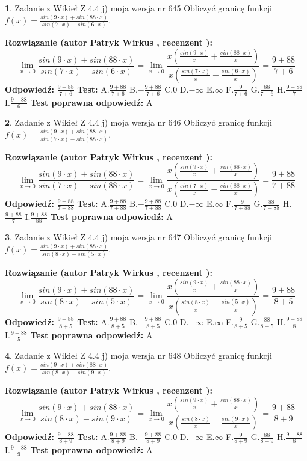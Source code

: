 \documentclass[12pt, a4paper]{article}
\theoremstyle{definition} %
\newtheorem{zad}{}
\newcommand{\zadStart}[1]{\begin{zad}#1\newline}
\newcommand{\zadStop}{\end{zad}}
\newcommand{\rozwStart}[2]{\noindent \textbf{Rozwiązanie (autor #1 , recenzent #2): }\newline}
\newcommand{\rozwStop}{\newline}
\newcommand{\odpStart}{\noindent \textbf{Odpowiedź:}\newline}
\newcommand{\odpStop}{\newline}
\newcommand{\testStart}{\noindent \textbf{Test:}\newline}
\newcommand{\testStop}{\newline}
\newcommand{\kluczStart}{\noindent \textbf{Test poprawna odpowiedź:}\newline}
\newcommand{\kluczStop}{\newline}
\begin{document}
\zadStart{Zadanie z Wikieł Z 4.4 j) moja wersja nr 645}
Obliczyć granicę funkcji $f(x)=\frac{sin(9\cdot x) +sin(88\cdot x)}{sin(7\cdot x) -sin(6\cdot x)}$.
\zadStop
\rozwStart{Patryk Wirkus}{}
$$\lim\limits_{x\to 0}\frac{sin(9\cdot x) +sin(88\cdot x)}{sin(7\cdot x) -sin(6\cdot x)}=\lim\limits_{x\to 0}\frac{x(\frac{sin(9\cdot x)}{x}+\frac{sin(88\cdot x)}{x})}{x(\frac{sin(7\cdot x)}{x}-\frac{sin(6\cdot x)}{x})}=\frac{9+88}{7+6}$$
\rozwStop
\odpStart
$\frac{9+88}{7+6}$
\odpStop
\testStart
A.$\frac{9+88}{7+6}$
B.$-\frac{9+88}{7+6}$
C.$0$
D.$-\infty$
E.$\infty$
F.$\frac{9}{7+6}$
G.$\frac{88}{7+6}$
H.$\frac{9+88}{7}$
I.$\frac{9+88}{6}$
\testStop
\kluczStart
A
\kluczStop



\zadStart{Zadanie z Wikieł Z 4.4 j) moja wersja nr 646}
Obliczyć granicę funkcji $f(x)=\frac{sin(9\cdot x) +sin(88\cdot x)}{sin(7\cdot x) -sin(88\cdot x)}$.
\zadStop
\rozwStart{Patryk Wirkus}{}
$$\lim\limits_{x\to 0}\frac{sin(9\cdot x) +sin(88\cdot x)}{sin(7\cdot x) -sin(88\cdot x)}=\lim\limits_{x\to 0}\frac{x(\frac{sin(9\cdot x)}{x}+\frac{sin(88\cdot x)}{x})}{x(\frac{sin(7\cdot x)}{x}-\frac{sin(88\cdot x)}{x})}=\frac{9+88}{7+88}$$
\rozwStop
\odpStart
$\frac{9+88}{7+88}$
\odpStop
\testStart
A.$\frac{9+88}{7+88}$
B.$-\frac{9+88}{7+88}$
C.$0$
D.$-\infty$
E.$\infty$
F.$\frac{9}{7+88}$
G.$\frac{88}{7+88}$
H.$\frac{9+88}{7}$
I.$\frac{9+88}{88}$
\testStop
\kluczStart
A
\kluczStop



\zadStart{Zadanie z Wikieł Z 4.4 j) moja wersja nr 647}
Obliczyć granicę funkcji $f(x)=\frac{sin(9\cdot x) +sin(88\cdot x)}{sin(8\cdot x) -sin(5\cdot x)}$.
\zadStop
\rozwStart{Patryk Wirkus}{}
$$\lim\limits_{x\to 0}\frac{sin(9\cdot x) +sin(88\cdot x)}{sin(8\cdot x) -sin(5\cdot x)}=\lim\limits_{x\to 0}\frac{x(\frac{sin(9\cdot x)}{x}+\frac{sin(88\cdot x)}{x})}{x(\frac{sin(8\cdot x)}{x}-\frac{sin(5\cdot x)}{x})}=\frac{9+88}{8+5}$$
\rozwStop
\odpStart
$\frac{9+88}{8+5}$
\odpStop
\testStart
A.$\frac{9+88}{8+5}$
B.$-\frac{9+88}{8+5}$
C.$0$
D.$-\infty$
E.$\infty$
F.$\frac{9}{8+5}$
G.$\frac{88}{8+5}$
H.$\frac{9+88}{8}$
I.$\frac{9+88}{5}$
\testStop
\kluczStart
A
\kluczStop



\zadStart{Zadanie z Wikieł Z 4.4 j) moja wersja nr 648}
Obliczyć granicę funkcji $f(x)=\frac{sin(9\cdot x) +sin(88\cdot x)}{sin(8\cdot x) -sin(9\cdot x)}$.
\zadStop
\rozwStart{Patryk Wirkus}{}
$$\lim\limits_{x\to 0}\frac{sin(9\cdot x) +sin(88\cdot x)}{sin(8\cdot x) -sin(9\cdot x)}=\lim\limits_{x\to 0}\frac{x(\frac{sin(9\cdot x)}{x}+\frac{sin(88\cdot x)}{x})}{x(\frac{sin(8\cdot x)}{x}-\frac{sin(9\cdot x)}{x})}=\frac{9+88}{8+9}$$
\rozwStop
\odpStart
$\frac{9+88}{8+9}$
\odpStop
\testStart
A.$\frac{9+88}{8+9}$
B.$-\frac{9+88}{8+9}$
C.$0$
D.$-\infty$
E.$\infty$
F.$\frac{9}{8+9}$
G.$\frac{88}{8+9}$
H.$\frac{9+88}{8}$
I.$\frac{9+88}{9}$
\testStop
\kluczStart
A
\kluczStop
\end{document}

